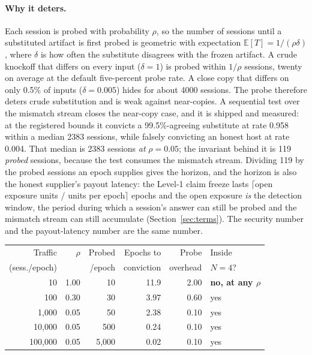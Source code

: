 \documentclass[11pt]{article}
\begin{document}
\paragraph{Why it deters.} Each session is probed with
probability $\rho$, so the number of sessions until a substituted
artifact is first probed is geometric with expectation
$\mathbb{E}[T] = 1/(\rho\delta)$, where $\delta$ is how often the
substitute disagrees with the frozen artifact. A crude knockoff
that differs on every input ($\delta = 1$) is probed within
$1/\rho$ sessions, twenty on average at the default
five-percent probe rate. A close copy that differs on only 0.5\%
of inputs ($\delta = 0.005$) hides for about 4000 sessions. The
probe therefore deters crude substitution and is weak against
near-copies. A sequential test over the mismatch stream closes
the near-copy case, and it is shipped and measured: at the
registered bounds it convicts a 99.5\%-agreeing substitute at
rate 0.958 within a median 2383 sessions, while falsely
convicting an honest host at rate 0.004. That median is
2383 sessions \emph{at} $\rho=0.05$; the invariant behind it is
119 \emph{probed} sessions, because the test consumes the mismatch
stream. Dividing 119 by the probed sessions an epoch supplies
gives the horizon, and the horizon is also the honest supplier's
payout latency: the Level-1 claim freeze lasts
$\lceil$open exposure units / units per epoch$\rceil$ epochs and
the open exposure \emph{is} the detection window, the period
during which a session's answer can still be probed and the
mismatch stream can still accumulate (Section~\ref{sec:terms}).
The security number and the payout-latency number are the same
number.

\begin{center}\small
    \begin{tabular}{rrrrrl}
        \toprule
        Traffic       & $\rho$ & Probed  & Epochs to  & Probe    & Inside                     \\
        (sess./epoch) &        & /epoch  & conviction & overhead & $N=4$?                     \\
        \midrule
        10            & 1.00   & 10      & 11.9       & 2.00     & \textbf{no, at any $\rho$} \\
        100           & 0.30   & 30      & 3.97       & 0.60     & yes                        \\
        1{,}000       & 0.05   & 50      & 2.38       & 0.10     & yes                        \\
        10{,}000      & 0.05   & 500     & 0.24       & 0.10     & yes                        \\
        100{,}000     & 0.05   & 5{,}000 & 0.02       & 0.10     & yes                        \\
        \bottomrule
    \end{tabular}
\end{center}
\end{document}
